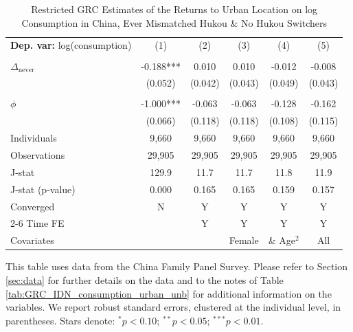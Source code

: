 \begin{table}[htbp] \centering \begin{threeparttable}
 \caption{Restricted GRC Estimates of the Returns to Urban Location on log Consumption in China, Ever Mismatched Hukou & No Hukou Switchers} 
 \label{tab:GRC_CHN_m_same_consumption_urban_unb} 
\begin{tabular}{l ccccc} \toprule  \textbf{Dep. var:}  log(consumption) 
                    &\multicolumn{1}{c}{(1)}   &\multicolumn{1}{c}{(2)}   &\multicolumn{1}{c}{(3)}   &\multicolumn{1}{c}{(4)}   &\multicolumn{1}{c}{(5)}   \\
                    &               &               &               &               &               \\
\addlinespace
$\Delta_{\text{never}}$&      -0.188***&       0.010   &       0.010   &      -0.012   &      -0.008   \\
                    &     (0.052)   &     (0.042)   &     (0.043)   &     (0.049)   &     (0.043)   \\
                    &               &               &               &               &               \\
\addlinespace
$\phi$              &      -1.000***&      -0.063   &      -0.063   &      -0.128   &      -0.162   \\
                    &     (0.066)   &     (0.118)   &     (0.118)   &     (0.108)   &     (0.115)   \\
\addlinespace
Individuals         &       9,660   &       9,660   &       9,660   &       9,660   &       9,660   \\
Observations        &      29,905   &      29,905   &      29,905   &      29,905   &      29,905   \\
J-stat              &       129.9   &        11.7   &        11.7   &        11.8   &        11.9   \\
J-stat (p-value)    &       0.000   &       0.165   &       0.165   &       0.159   &       0.157   \\
Converged           &           N   &           Y   &           Y   &           Y   &           Y   \\
\cmidrule{2-6} Time FE & & Y & Y & Y & Y \\ Covariates & & & Female & \& Age$^2$ & All \\ \bottomrule \end{tabular} \begin{tablenotes}[flushleft] \footnotesize \item{This table uses data from the China Family Panel Survey. Please refer to Section \ref{sec:data} for further details on the data and to the notes of Table \ref{tab:GRC_IDN_consumption_urban_unb} for additional information on the variables. We report robust standard errors, clustered at the individual level, in parentheses. Stars denote: $^{*} p<0.10$; $^{**} p<0.05$; $^{***} p<0.01$.} \end{tablenotes} \end{threeparttable} \end{table}
